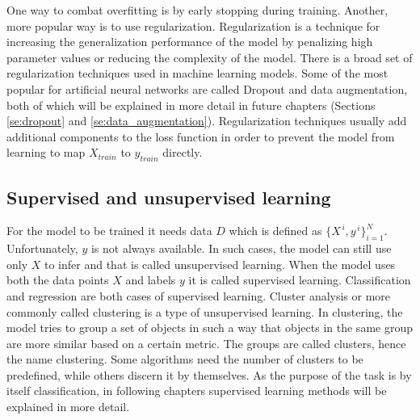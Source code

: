 \documentclass[times, utf8, diplomski]{fer}
\begin{document}
One way to combat overfitting is by early stopping during training. Another, more popular way is to use regularization. Regularization is a technique for increasing the generalization performance of the model by penalizing high parameter values or reducing the complexity of the model. There is a broad set of regularization techniques used in machine learning models. Some of the most popular for artificial neural networks are called Dropout \citep{srivastava_dropout:_2014} and data augmentation, both of which will be explained in more detail in future chapters (Sections \ref{se:dropout} and \ref{se:data_augmentation}). Regularization techniques usually add additional components to the loss function in order to prevent the model from learning to map $X_{train}$ to $y_{train}$ directly.


\subsection{Supervised and unsupervised learning}
For the model to be trained it needs data $D$ which is defined as $\{{X}^{\,i},y^{\,i}\}^{N}_{i=1}$. Unfortunately, $y$ is not always available. In such cases, the model can still use only $X$ to infer and that is called unsupervised learning. When the model uses both the data points $X$ and labels $y$ it is called supervised learning. Classification and regression are both cases of supervised learning. Cluster analysis or more commonly called clustering is a type of unsupervised learning. In clustering, the model tries to group a set of objects in such a way that objects in the same group are more similar based on a certain metric. The groups are called clusters, hence the name clustering. Some algorithms need the number of clusters to be predefined, while others discern it by themselves. As the purpose of the task is by itself classification, in following chapters supervised learning methods will be explained in more detail.
\end{document}
